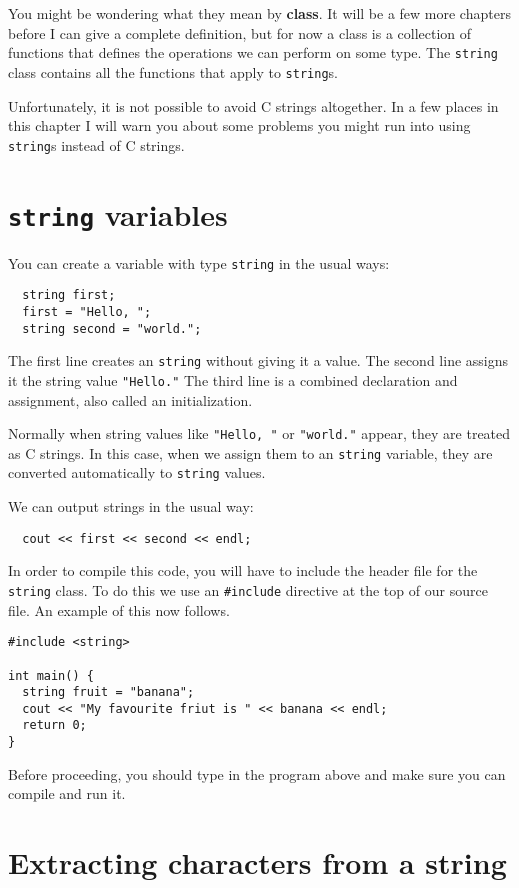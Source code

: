 You might be wondering what they mean by {\bf class}.  It will be a few
more chapters before I can give a complete definition, but for now a
class is a collection of functions that defines the operations we
can perform on some type.  The {\tt string} class contains all
the functions that apply to {\tt string}s.

Unfortunately, it is not possible to avoid C strings altogether.
In a few places in this chapter I will warn you about some problems
you might run into using {\tt string}s instead of C strings.

\section{{\tt string} variables}

You can create a variable with type {\tt string} in the usual
ways:

\begin{lstlisting}
  string first;
  first = "Hello, ";
  string second = "world.";
\end{lstlisting}
%
The first line creates an {\tt string} without giving it a value.
The second line assigns it the string value {\tt "Hello."}
The third line is a combined declaration and assignment, also
called an initialization.

Normally when string values like {\tt "Hello, "} or {\tt "world."}
appear, they are treated as C strings.  In this case, when we assign
them to an {\tt string} variable, they are converted automatically
to {\tt string} values.

We can output strings in the usual way:

\begin{lstlisting}
  cout << first << second << endl;
\end{lstlisting}
%

In order to compile this code, you will have to include the
header file for the {\tt string} class.  To do this we use an
\texttt{\#include} directive at the top of our source file.
An example of this now follows.
\begin{lstlisting}
#include <string>

int main() {
  string fruit = "banana";
  cout << "My favourite friut is " << banana << endl;
  return 0;
}
\end{lstlisting}

Before proceeding, you should type in the program above and make
sure you can compile and run it.

\section{Extracting characters from a string}

